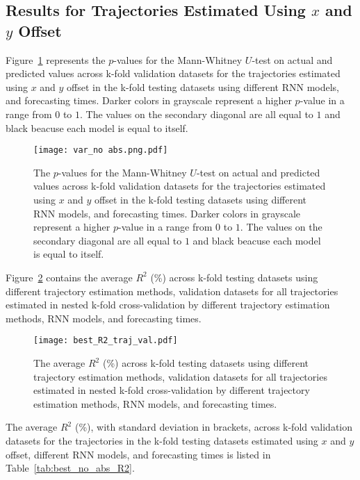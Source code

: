 \subsection{Results for Trajectories Estimated Using $x$ and $y$ Offset}

Figure~\ref{fig:var_no abs.png} represents the $p$-values for the Mann-Whitney $U$-test on actual and predicted values across k-fold validation datasets for the trajectories estimated using $x$ and $y$ offset in the k-fold testing datasets using different RNN models, and forecasting times. Darker colors in grayscale represent a higher $p$-value in a range from $0$ to $1$. The values on the secondary diagonal are all equal to $1$ and black beacuse each model is equal to itself.

\begin{figure}[!ht]
	\centering
	\texttt{[image: var\_no abs.png.pdf]}
	\caption{The $p$-values for the Mann-Whitney $U$-test on actual and predicted values across k-fold validation datasets for the trajectories estimated using $x$ and $y$ offset in the k-fold testing datasets using different RNN models, and forecasting times. Darker colors in grayscale represent a higher $p$-value in a range from $0$ to $1$. The values on the secondary diagonal are all equal to $1$ and black beacuse each model is equal to itself.}
	\label{fig:var_no abs.png}
\end{figure}

Figure~\ref{fig:best_R2_traj_val} contains the average $R^{2}$ (\%) across k-fold testing datasets using different trajectory estimation methods, validation datasets for all trajectories estimated in nested k-fold cross-validation by different trajectory estimation methods, RNN models, and forecasting times.

\begin{figure}[!ht]
	\centering
	\texttt{[image: best\_R2\_traj\_val.pdf]}
	\caption{The average $R^{2}$ (\%) across k-fold testing datasets using different trajectory estimation methods, validation datasets for all trajectories estimated in nested k-fold cross-validation by different trajectory estimation methods, RNN models, and forecasting times.}
	\label{fig:best_R2_traj_val}
\end{figure}

The average $R^{2}$ (\%), with standard deviation in brackets, across k-fold validation datasets for the trajectories in the k-fold testing datasets estimated using $x$ and $y$ offset, different RNN models, and forecasting times is listed in Table~\ref{tab:best_no_abs_R2}.

